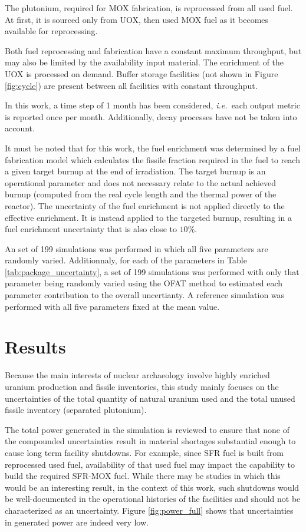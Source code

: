 \documentclass{anstrans}
\newcommand{\ie}{\emph{i.e.\ }}
\begin{document}
The plutonium, required for \gls{MOX} fabrication, is reprocessed from all used
fuel.  At first, it is sourced only from \gls{UOX}, then used \gls{MOX} fuel as
it becomes available for reprocessing.

Both fuel reprocessing and fabrication have a constant maximum throughput, but
may also be limited by the availability input material.  The enrichment of the
\gls{UOX} is processed on demand.  Buffer storage facilities (not shown in
Figure \ref{fig:cycle}) are present between all facilities with constant
throughput.

In this work, a time step of 1 month has been considered, \ie each output metric
is reported once per month. Additionally, decay processes have not be taken into
account.  

It must be noted that for this work, the fuel enrichment was determined by a
fuel fabrication model\cite{Leniau2015125} which calculates the fissile fraction
required in the fuel to reach a given target burnup at the end of irradiation.
The target burnup is an operational parameter and does not necessary relate to
the actual achieved burnup (computed from the real cycle length and the thermal
power of the reactor). The uncertainty of the fuel enrichment is not applied
directly to the effective enrichment. It is instead applied to the targeted
burnup, resulting in a fuel enrichment uncertainty that is also close to $10\%$.


An set of 199 simulations was performed in which all five parameters are
randomly varied. Additionnaly, for each of the parameters in Table
\ref{tab:package_uncertainty}, a set of 199 simulations was performed with only
that parameter being randomly varied using the \gls{OFAT} method to estimated each
parameter contribution to the overall uncertianty.  A reference simulation was
performed with all five parameters fixed at the mean value.

\section{Results}

Because the main interests of nuclear archaeology involve highly enriched
uranium production and fissile inventories, this study mainly focuses on the
uncertainties of the total quantity of natural uranium used and the total unused
fissile inventory (separated plutonium).

The total power generated in the simulation is reviewed to ensure that none of
the compounded uncertainties result in material shortages substantial enough to
cause long term facility shutdowns.  For example, since \gls{SFR} fuel is built
from reprocessed used fuel, availability of that used fuel may impact the
capability to build the required \gls{SFR}-\gls{MOX} fuel.  While there may be
studies in which this would be an interesting result, in the context of this
work, such shutdowns would be well-documented in the operational histories of
the facilities and should not be characterized as an uncertainty.  Figure
\ref{fig:power_full} shows that uncertainties in generated power are indeed very
low.
\end{document}
